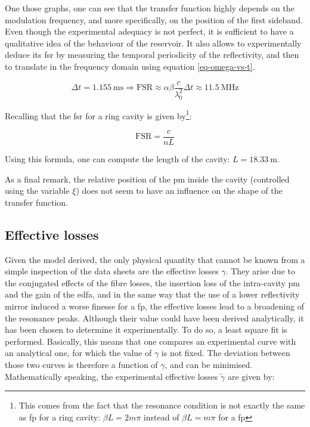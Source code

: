 One those graphs, one can see that the transfer function highly depends on the modulation frequency, and more specifically, on the position of the first sideband. Even though the experimental adequacy is not perfect, it is sufficient to have a qualitative idea of the behaviour of the reservoir. It also allows to experimentally deduce its \gls{fsr} by measuring the temporal periodicity of the reflectivity, and then to translate in the frequency domain using equation \eqref{eq-omega-vs-t}.

\begin{equation}
	\Delta t = \SI{1.155}{\milli\second} \Longrightarrow \text{FSR} \approx  \alpha \beta \frac{c}{\lambda_0^2} \Delta t  \approx \SI{11.5}{\mega\hertz}
\end{equation}

Recalling that the \gls{fsr} for a ring cavity is given by\footnote{This comes from the fact that the resonance condition is not exactly the same as \gls{fp} for a ring cavity: $\beta L = 2m\pi$ instead of $\beta L = m \pi$ for a \gls{fp}}:

\begin{equation}
	\mathrm{FSR} = \frac{c}{nL}
\end{equation}

Using this formula, one can compute the length of the cavity: $L=\SI{18.33}{\metre}$.

As a final remark, the relative position of the \gls{pm} inside the cavity (controlled using the variable $\xi$) does not seem to have an influence on the shape of the transfer function.


\subsection{Effective losses}

\label{subsec-effective-losses}

Given the model derived, the only physical quantity that cannot be known from a simple inspection of the data sheets are the effective losses $\gamma$. They arise due to the conjugated effects of the fibre losses, the insertion loss of the intra-cavity \gls{pm} and the gain of the \gls{edfa}, and in the same way that the use of a lower reflectivity mirror induced a worse finesse for a \gls{fp}, the effective losses lead to a broadening of the resonance peaks. Although their value could have been derived analytically, it has been chosen to determine it experimentally. To do so, a least square fit is performed. Basically, this means that one compares an experimental curve with an analytical one, for which the value of $\gamma$ is not fixed. The deviation between those two curves is therefore a function of $\gamma$, and can be minimised. Mathematically speaking, the experimental effective losses $\tilde{\gamma}$ are given by:


